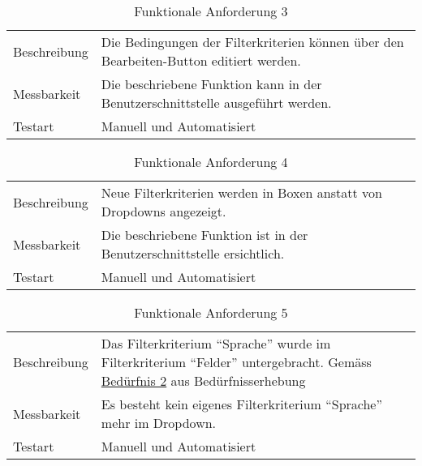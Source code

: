 \begin{table}[h!]
   \begin{tabular}{|L{0.3\textwidth}|L{0.6\textwidth}|}
       \hline
         \\[4pt]
       \hline
       Beschreibung & Die Bedingungen der Filterkriterien können über den Bearbeiten-Button editiert werden.  \\
       \hline
       Messbarkeit & Die beschriebene Funktion kann in der Benutzerschnittstelle ausgeführt werden. \\
       \hline
       Testart & Manuell und Automatisiert \\
       \hline
     \end{tabular}
     \caption{Funktionale Anforderung 3}
\end{table}

\begin{table}[h!]
   \begin{tabular}{|L{0.3\textwidth}|L{0.6\textwidth}|}
       \hline
         \\[4pt]
       \hline
       Beschreibung & Neue Filterkriterien werden in Boxen anstatt von Dropdowns angezeigt. \\
       \hline
       Messbarkeit & Die beschriebene Funktion ist in der Benutzerschnittstelle ersichtlich. \\
       \hline
       Testart & Manuell und Automatisiert \\
       \hline
     \end{tabular}
     \caption{Funktionale Anforderung 4}
\end{table}

\begin{table}[h!]
   \begin{tabular}{|L{0.3\textwidth}|L{0.6\textwidth}|}
       \hline
         \\[4pt]
       \hline
       Beschreibung & Das Filterkriterium ``Sprache'' wurde im Filterkriterium ``Felder'' untergebracht. Gemäss \hyperref[bed2]{\color{blue}Bedürfnis 2} aus Bedürfnisserhebung \\
       \hline
       Messbarkeit & Es besteht kein eigenes Filterkriterium ``Sprache'' mehr im Dropdown. \\
       \hline
       Testart & Manuell und Automatisiert \\
       \hline
     \end{tabular}
     \caption{Funktionale Anforderung 5}
\end{table}


